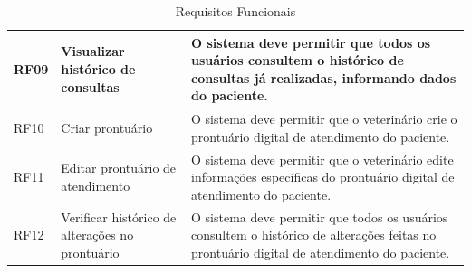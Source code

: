 \documentclass[
    12pt,               %
    openright,          %
    oneside,
    a4paper,            %
    BIBLATEX,           %
    TODO,               %
    english,            %
    brazil              %
    ]{ifsp-spo-inf-ctds}
\begin{document}
\begin{center}
\begin{table}[h]
\begin{tabulary}{1.0\textwidth}{|p{5em}|p{8em}|p{18em}|}
                RF09 & Visualizar histórico de consultas & O sistema deve permitir que todos os usuários consultem o histórico de consultas já realizadas, informando dados do paciente.\\
                \hline
                RF10 & Criar prontuário & O sistema deve permitir que o veterinário crie o prontuário digital de atendimento do paciente.\\
                \hline
                RF11 & Editar prontuário de atendimento & O sistema deve permitir que o veterinário edite informações específicas do prontuário digital de atendimento do paciente.\\
                \hline
                RF12 & Verificar histórico de alterações no prontuário & O sistema deve permitir que todos os usuários consultem o histórico de alterações feitas no prontuário digital de atendimento do paciente.\\
                \hline
                \end{tabulary}
                \caption{Requisitos Funcionais}
                \label{tab:req_func}
                \end{table}
            \end{center}
    
\end{document}

